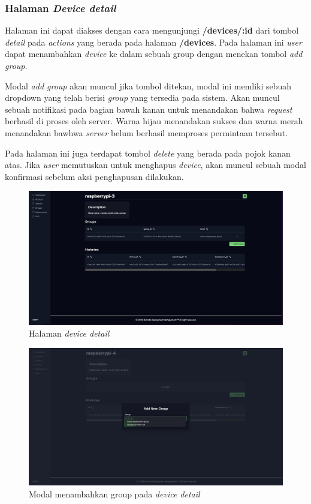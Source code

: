 \pagebreak

\subsubsection{Halaman \textit{Device detail}}
Halaman ini dapat diakses dengan cara mengunjungi \textbf{/devices/:id} dari tombol \textit{detail} pada \textit{actions} yang berada pada halaman \textbf{/devices}. Pada halaman ini \textit{user} dapat menambahkan \textit{device} ke dalam sebuah group dengan menekan tombol \textit{add group}.

Modal \textit{add group} akan muncul jika tombol ditekan, modal ini memliki sebuah dropdown yang telah berisi \textit{group} yang tersedia pada sistem. Akan muncul sebuah notifikasi pada bagian bawah kanan untuk menandakan bahwa \textit{request} berhasil di proses oleh server. Warna hijau menandakan sukses dan warna merah menandakan bawhwa \textit{server} belum berhasil memproses permintaan tersebut.

Pada halaman ini juga terdapat tombol \textit{delete} yang berada pada pojok kanan atas. Jika \textit{user} memutuskan untuk menghapus \textit{device}, akan muncul sebuah modal konfirmasi sebelum aksi penghapusan dilakukan.
\begin{figure}[h]
  \centering
  \includegraphics[width=1\textwidth]{resources/chapter-4/dashboard/device-detail-page.jpg}
  \caption{Halaman \textit{device detail}}
  \label{fig:halaman-device-detail}
\end{figure}

\begin{figure}[h]
  \centering
  \includegraphics[width=1\textwidth]{resources/chapter-4/dashboard/device-detail-add-group.jpg}
  \caption{Modal menambahkan group pada \textit{device detail}}
  \label{fig:halaman-device-detail-add-group}
\end{figure}

